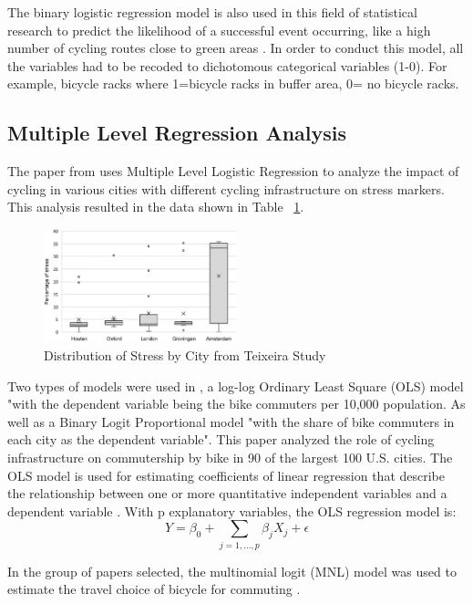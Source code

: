 \documentclass[12pt, letterpaper]{article}
\begin{document}
The binary logistic regression model is also used in this field of statistical research to predict the likelihood of a successful event occurring, like a high number of cycling routes close to green areas \cite{5CamposSnchez2019}. In order to conduct this model, all the variables had to be recoded to dichotomous categorical variables (1-0). For example, bicycle racks where 1=bicycle racks in buffer area, 0= no bicycle racks. 


\subsection{Multiple Level  Regression Analysis}
\label{sec:mult}

The paper from \citet{3Teixeira2020} uses Multiple Level Logistic Regression to analyze the impact of cycling in various cities with different cycling infrastructure on stress markers. This analysis resulted in the data shown in Table ~\ref{fig:stress}.
\begin{figure}[tbp]
    \centering
    \includegraphics[width=0.5\textwidth]{stresstable2.jpeg}
    \caption{Distribution of Stress by City from Teixeira Study}
    \label{fig:stress}
\end{figure}

Two types of models were used in \citet{4Buehler2011}, a log-log Ordinary Least Square (OLS) model "with the dependent variable being the bike commuters per 10,000 population. As well as a Binary Logit Proportional model "with the share of bike commuters in each city as the dependent variable". This paper analyzed the role of cycling infrastructure on commutership by bike in 90 of the largest 100 U.S. cities. The OLS model is used for estimating coefficients of linear regression that describe the relationship between one or more quantitative independent variables and a dependent variable \cite{XLSTAT2023}. With p explanatory variables, the OLS regression model is: 
\[Y = \beta_{0}+\sum_{j=1,\dots, p}{\beta_{j}X_{j}}+\epsilon\]

In the group of papers selected, the multinomial logit (MNL) model was used to estimate the travel choice of bicycle for commuting \cite{10Zhao2013}. 
\end{document}
